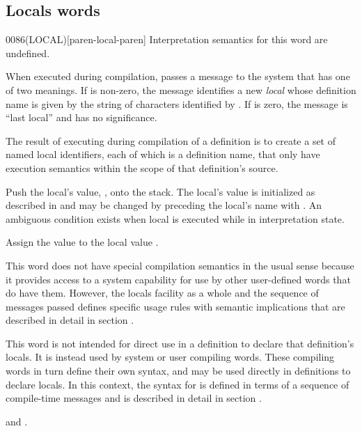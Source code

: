 \subsection{Locals words} %

\begin{worddef}[LOCAL]{0086}{(LOCAL)}[paren-local-paren]
\interpret
	Interpretation semantics for this word are undefined.

\execute

	When executed during compilation,  passes a
	message to the system that has one of two meanings. If 
	is non-zero, the message identifies a new \emph{local} whose
	definition name is given by the string of characters identified
	by . If  is zero, the message is ``last
	local'' and  has no significance.

	The result of executing  during compilation of a
	definition is to create a set of named local identifiers, each
	of which is a definition name, that only have execution
	semantics within the scope of that definition's source.

\execute[local]

	Push the local's value, , onto the stack. The local's
	value is initialized as described in  and may be changed by preceding the local's
	name with . An ambiguous condition exists when local is
	executed while in interpretation state.

 

	Assign the value  to the local value .

\note
	This word does not have special compilation semantics in the
	usual sense because it provides access to a system capability
	for use by other user-defined words that do have them. However,
	the locals facility as a whole and the sequence of messages
	passed defines specific usage rules with semantic implications
	that are described in detail in section
	.

\note
	This word is not intended for direct use in a definition to
	declare that definition's locals. It is instead used by system
	or user compiling words. These compiling words in turn define
	their own syntax, and may be used directly in definitions to
	declare locals. In this context, the syntax for 
	is defined in terms of a sequence of compile-time messages and
	is described in detail in section .

\see {} and
	.
\end{worddef}


